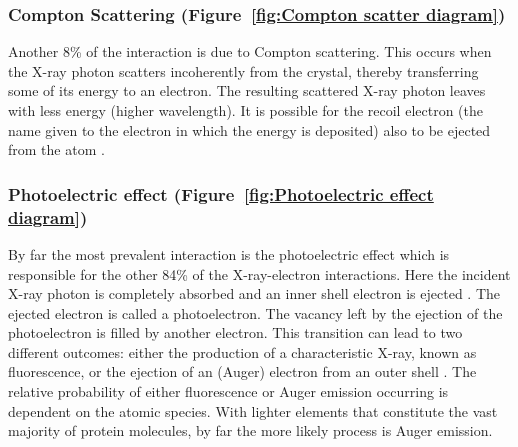         \subsubsection{Compton Scattering (Figure~\ref{fig:Compton scatter diagram})}
        \label{subs:Compton Scattering}
            Another 8\% of the interaction is due to Compton scattering.
            This occurs when the X-ray photon scatters incoherently from the crystal, thereby transferring some of its energy to an electron.
            The resulting scattered X-ray photon leaves with less energy (higher wavelength).
            It is possible for the recoil electron (the name given to the electron in which the energy is deposited) also to be ejected from the atom \cite{nave1995}.

        \subsubsection{Photoelectric effect (Figure~\ref{fig:Photoelectric effect diagram})}
        \label{subs:Photoelectric effect}
            By far the most prevalent interaction is the photoelectric effect which is responsible for the other 84\% of the X-ray-electron interactions.
            Here the incident X-ray photon is completely absorbed and an inner shell electron is ejected \cite{garman2010}.
            The ejected electron is called a photoelectron.
            The vacancy left by the ejection of the photoelectron is filled by another electron.
            This transition can lead to two different outcomes: either the production of a characteristic X-ray, known as fluorescence, or the ejection of an (Auger) electron from an outer shell \cite{nave1995}.
            The relative probability of either fluorescence or Auger emission occurring is dependent on the atomic species.
            With lighter elements that constitute the vast majority of protein molecules, by far the more likely process is Auger emission.

